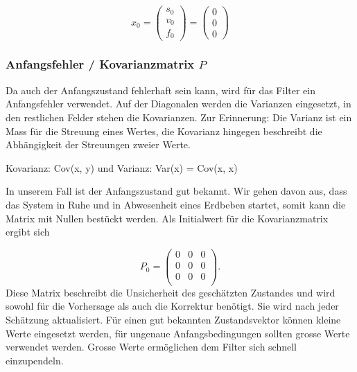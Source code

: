 \[ {x_0 }= \left( \begin{array}{c} {s_0}\\ {v_0}\\{f_0}\end{array}\right) = \left( \begin{array}{c} 0\\ 0\\ 0\end{array}\right) \]

\subsubsection*{Anfangsfehler / Kovarianzmatrix $P$}
Da auch der Anfangszustand fehlerhaft sein kann, wird für das Filter ein Anfangsfehler verwendet. 
Auf der Diagonalen werden die Varianzen eingesetzt, in den restlichen Felder stehen die Kovarianzen.
Zur Erinnerung: Die Varianz ist ein Mass für die Streuung eines Wertes, die Kovarianz hingegen beschreibt die Abhängigkeit der Streuungen zweier Werte.

Kovarianz: Cov(x, y) und Varianz: Var(x) = Cov(x, x)

In unserem Fall ist der Anfangszustand gut bekannt. 
Wir gehen davon aus, dass das System in Ruhe und in Abwesenheit eines Erdbeben startet, somit kann die Matrix mit Nullen bestückt werden. 
Als Initialwert für die Kovarianzmatrix ergibt sich

\[ 
{P_0 }=
\left(
\begin{array}{ccc} 	
0 & 0 &0 \\ 
0 &0 & 0 \\ 
0 & 0 &0 \\
\end{array}
\right).
 \] 
Diese Matrix beschreibt die Unsicherheit des geschätzten Zustandes und wird sowohl für die Vorhersage als auch die Korrektur benötigt. 
Sie wird nach jeder Schätzung aktualisiert. 
Für einen gut bekannten Zustandsvektor können kleine Werte eingesetzt werden, für ungenaue Anfangsbedingungen sollten grosse Werte verwendet werden. 
Grosse Werte ermöglichen dem Filter sich schnell einzupendeln. 

